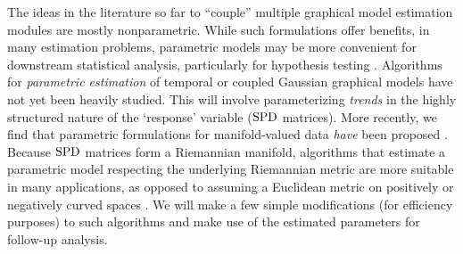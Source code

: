 The ideas in the literature so far to ``couple'' multiple graphical model estimation modules are mostly nonparametric. 
While such formulations offer benefits, in many estimation problems, 
parametric models may 
be more convenient for downstream statistical analysis,
particularly for hypothesis testing \citep{hardle1993comparing,geer2000empirical,roehrig1988conditions}.
Algorithms for {\em parametric estimation} of 
temporal or coupled Gaussian graphical models have not yet been heavily studied. 
This will involve parameterizing {\em trends} in the highly structured nature of the `response' variable ($\text{SPD}$ matrices). 
More recently, we find that parametric formulations for manifold-valued data {\em have} been proposed \citep{hjkimcvpr2014,cornea2016regression}. %
Because $\text{SPD}$ matrices form a Riemannian manifold, algorithms
that estimate a parametric model respecting the underlying Riemannian metric are more suitable in many applications,
as opposed to assuming a Euclidean metric 
on positively or negatively curved spaces \citep{xie2010statistical, fletcher2007riemannian, jayasumanakernel}. We will make a few simple modifications 
(for efficiency purposes) to such algorithms and make use of the estimated parameters for follow-up analysis.


